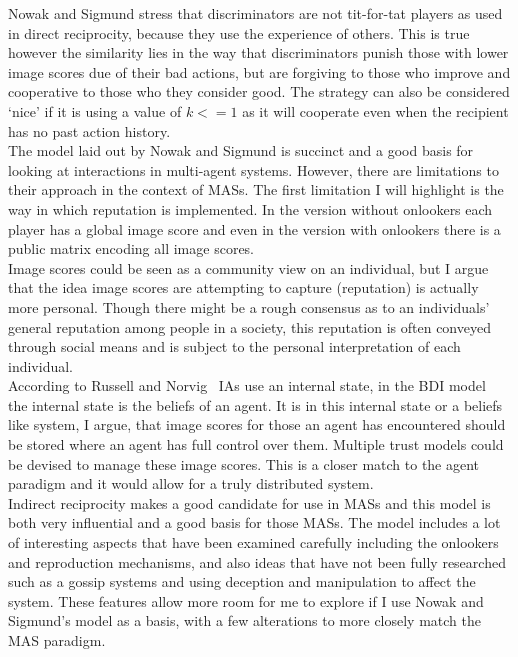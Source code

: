 \documentclass[]{final_report}
\begin{document}
Nowak and Sigmund stress that discriminators are not tit-for-tat players as used in direct reciprocity, because they use the experience of others. This is true however the similarity lies in the way that discriminators punish those with lower image scores due of their bad actions, but are forgiving to those who improve and cooperative to those who they consider good. The strategy can also be considered `nice' if it is using a value of $k<=1$ as it will cooperate even when the recipient has no past action history.\\
The model laid out by Nowak and Sigmund is succinct and a good basis for looking at interactions in multi-agent systems. However, there are limitations to their approach in the context of MASs. The first limitation I will highlight is the way in which reputation is implemented. In the version without onlookers each player has a global image score and even in the version with onlookers there is a public matrix encoding all image scores.\\
Image scores could be seen as a community view on an individual, but I argue that the idea image scores are attempting to capture (reputation) is actually more personal. Though there might be a rough consensus as to an individuals' general reputation among people in a society, this reputation is often conveyed through social means and is subject to the personal interpretation of each individual.\\
According to Russell and Norvig~\cite{russell2016artificial} IAs use an internal state, in the BDI model~\cite{rao1995bdi} the internal state is the beliefs of an agent. It is in this internal state or a beliefs like system, I argue, that image scores for those an agent has encountered should be stored where an agent has full control over them. Multiple trust models could be devised to manage these image scores. This is a closer match to the agent paradigm and it would allow for a truly distributed system.\\
Indirect reciprocity makes a good candidate for use in MASs and this model is both very influential and a good basis for those MASs. The model includes a lot of interesting aspects that have been examined carefully including the onlookers and reproduction mechanisms, and also ideas that have not been fully researched such as a gossip systems and using deception and manipulation to affect the system. These features allow more room for me to explore if I use Nowak and Sigmund's model as a basis, with a few alterations to more closely match the MAS paradigm.
\end{document}
